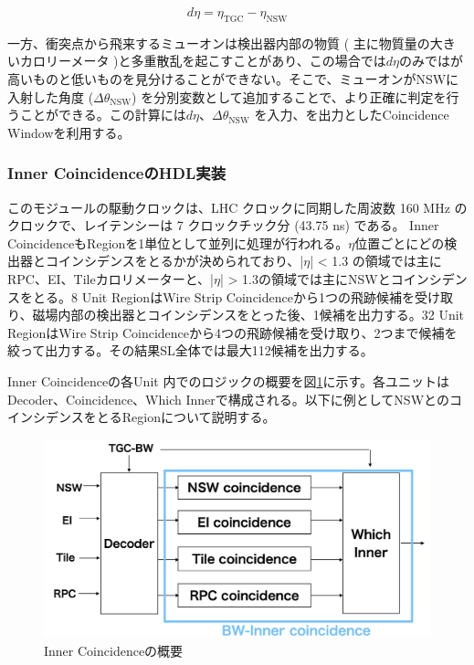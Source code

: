 \begin{equation}
    d\eta = \eta_{\mathrm{TGC}} - \eta_{\mathrm{NSW}}
    \label{eq:deta}
\end{equation}

一方、衝突点から飛来するミューオンは検出器内部の物質 ( 主に物質量の大きいカロリーメータ )と多重散乱を起こすことがあり、この場合では$d\eta$のみでは\pt が高いものと低いものを見分けることができない。そこで、ミューオンがNSWに入射した角度 ($\Delta\theta_{\mathrm{NSW}}$) を分別変数として追加することで、より正確に\pt 判定を行うことができる。この計算には$d\eta$、$\Delta\theta_{\mathrm{NSW}}$ を入力、\pt を出力としたCoincidence Windowを利用する。

\subsubsection*{Inner CoincidenceのHDL実装}
このモジュールの駆動クロックは、LHC クロックに同期した周波数 160 MHz のクロックで、レイテンシーは 7 クロックチック分 (43.75 ns) である。
Inner CoincidenceもRegionを1単位として並列に処理が行われる。$\eta$位置ごとにどの検出器とコインシデンスをとるかが決められており、|$\eta$| < 1.3 の領域では主にRPC、EI、Tileカロリメーターと、|$\eta$| > 1.3の領域では主にNSWとコインシデンスをとる。8 Unit RegionはWire Strip Coincidenceから1つの飛跡候補を受け取り、磁場内部の検出器とコインシデンスをとった後、1候補を出力する。32 Unit RegionはWire Strip Coincidenceから4つの飛跡候補を受け取り、2つまで候補を絞って出力する。その結果SL全体では最大112候補を出力する。

Inner Coincidenceの各Unit 内でのロジックの概要を図\ref{Inner_logic}に示す。各ユニットはDecoder、Coincidence、Which Innerで構成される。以下に例としてNSWとのコインシデンスをとるRegionについて説明する。

\begin{figure} 
\centering
\includegraphics[width=16cm]{fig/SL/Inner_integrate.png}
\caption[Inner Coincidenceの概要]{Inner Coincidenceの概要\cite{mt_kobayashi}}
\label{Inner_logic}
\end{figure}

